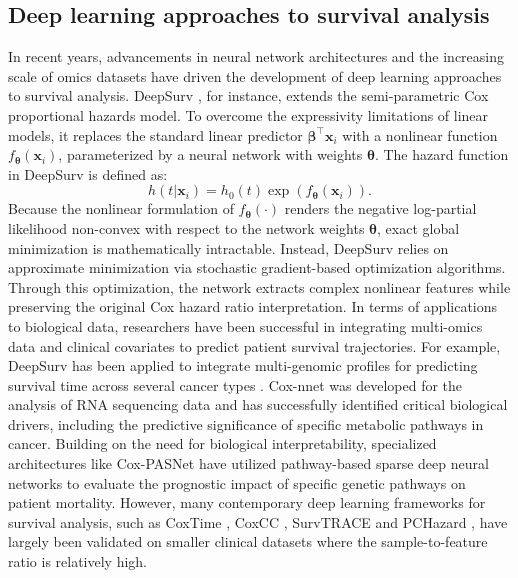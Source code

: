 \subsection{Deep learning approaches to survival analysis}

In recent years, advancements in neural network architectures and the increasing scale of omics datasets have driven the development of deep learning approaches to survival analysis. DeepSurv \cite{katzman_deepsurv_2018}, for instance, extends the semi-parametric Cox proportional hazards model. To overcome the expressivity limitations of linear models, it replaces the standard linear predictor $\bm{\beta}^\top \bm{x}_i$ with a nonlinear function $f_{\bm{\theta}}(\bm{x}_i)$, parameterized by a neural network with weights $\bm{\theta}$. The hazard function in DeepSurv is defined as:
\begin{equation}
h(t|\bm{x}_i) = h_0(t) \exp(f_{\bm{\theta}}(\bm{x}_i)).
\end{equation}
Because the nonlinear formulation of $f_{\bm{\theta}}(\cdot)$ renders the negative log-partial likelihood non-convex with respect to the network weights $\bm{\theta}$, exact global minimization is mathematically intractable. Instead, DeepSurv relies on approximate minimization via stochastic gradient-based optimization algorithms. Through this optimization, the network extracts complex nonlinear features while preserving the original Cox hazard ratio interpretation. In terms of applications to biological data, researchers have been successful in integrating multi-omics data and clinical covariates to predict patient survival trajectories. For example, DeepSurv has been applied to integrate multi-genomic profiles for predicting survival time across several cancer types \cite{deepsurv_application2022,Chaudhary2018}. Cox-nnet \cite{coxnnet2018} was developed for the analysis of RNA sequencing data and has successfully identified critical biological drivers, including the predictive significance of specific metabolic pathways in cancer.
Building on the need for biological interpretability, specialized architectures like Cox-PASNet \cite{coxpasnet2018} have utilized pathway-based sparse deep neural networks to evaluate the prognostic impact of specific genetic pathways on patient mortality. However, many contemporary deep learning frameworks for survival analysis, such as CoxTime \cite{CoxTime2019}, CoxCC \cite{CoxTime2019}, SurvTRACE \cite{SurvTrace2022} and PCHazard \cite{PChazard2021}, have largely been validated on smaller clinical datasets where the sample-to-feature ratio is relatively high.

